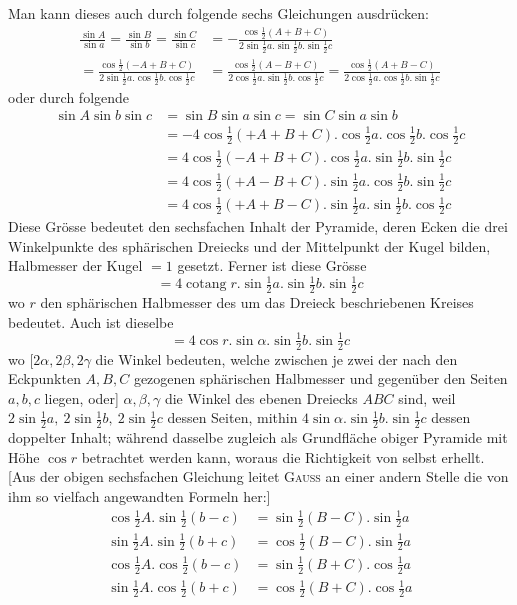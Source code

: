 %
\par
Man kann dieses auch durch folgende sechs Gleichungen ausdrücken:
\[
\begin{aligned}
\frac{\sin A}{\sin a}=\frac{\sin B}{\sin b}=\frac{\sin C}{\sin c}&=-\frac{\cos\tfrac12(A+B+C)}{2\sin\tfrac12a.\sin\tfrac12b.\sin\tfrac12c}\\
=\frac{\cos\tfrac12(-A+B+C)}{2\sin\tfrac12a.\cos\tfrac12b.\cos\tfrac12c}&=\frac{\cos\tfrac12(A-B+C)}{2\cos\tfrac12a.\sin\tfrac12b.\cos\tfrac12c}=\frac{\cos\tfrac12(A+B-C)}{2\cos\tfrac12a.\cos\tfrac12b.\sin\tfrac12c}
\end{aligned}
\]
oder durch folgende
\[
\begin{aligned}
\sin A\sin b\sin c&=\sin B\sin a\sin c=\sin C\sin a\sin b\\
&=-4\cos\tfrac12(+A+B+C).\cos\tfrac12a.\cos\tfrac12b.\cos\tfrac12c\\
&=4\cos\tfrac12(-A+B+C).\cos\tfrac12a.\sin\tfrac12b.\sin\tfrac12c\\
&=4\cos\tfrac12(+A-B+C).\sin\tfrac12a.\cos\tfrac12b.\sin\tfrac12c\\
&=4\cos\tfrac12(+A+B-C).\sin\tfrac12a.\sin\tfrac12b.\cos\tfrac12c
\end{aligned}
\]
Diese Grösse bedeutet den sechsfachen Inhalt der Pyramide, deren Ecken die drei Winkelpunkte des sphärischen Dreiecks und der Mittelpunkt der Kugel bilden, Halbmesser der Kugel \(=1\) gesetzt. Ferner ist diese Grösse
\[
=4\operatorname{cotang}r.\sin\tfrac12a.\sin\tfrac12b.\sin\tfrac12c
\]
wo \(r\) den sphärischen Halbmesser des um das Dreieck beschriebenen Kreises bedeutet. Auch ist dieselbe
\[
=4\cos r.\sin\alpha.\sin\tfrac12b.\sin\tfrac12c
\]
wo [\(2\alpha,2\beta,2\gamma\) die Winkel bedeuten, welche zwischen je zwei der nach den Eckpunkten \(A,B,C\) gezogenen sphärischen Halbmesser und gegenüber den Seiten \(a,b,c\) liegen, oder] \(\alpha,\beta,\gamma\) die Winkel des ebenen Dreiecks \(ABC\) sind, weil \(2\sin\tfrac12a,\ 2\sin\tfrac12b,\ 2\sin\tfrac12c\) dessen Seiten, mithin \(4\sin\alpha.\sin\tfrac12b.\sin\tfrac12c\) dessen doppelter Inhalt; während dasselbe zugleich als Grundfläche obiger Pyramide mit Höhe \(\cos r\) betrachtet werden kann, woraus die Richtigkeit von selbst erhellt. [Aus der obigen sechsfachen Gleichung leitet \textsc{Gauss} an einer andern Stelle die von ihm so vielfach angewandten Formeln her:]
\[
\begin{aligned}
\cos\tfrac12A.\sin\tfrac12(b-c)&=\sin\tfrac12(B-C).\sin\tfrac12a\\
\sin\tfrac12A.\sin\tfrac12(b+c)&=\cos\tfrac12(B-C).\sin\tfrac12a\\
\cos\tfrac12A.\cos\tfrac12(b-c)&=\sin\tfrac12(B+C).\cos\tfrac12a\\
\sin\tfrac12A.\cos\tfrac12(b+c)&=\cos\tfrac12(B+C).\cos\tfrac12a
\end{aligned}
\]
